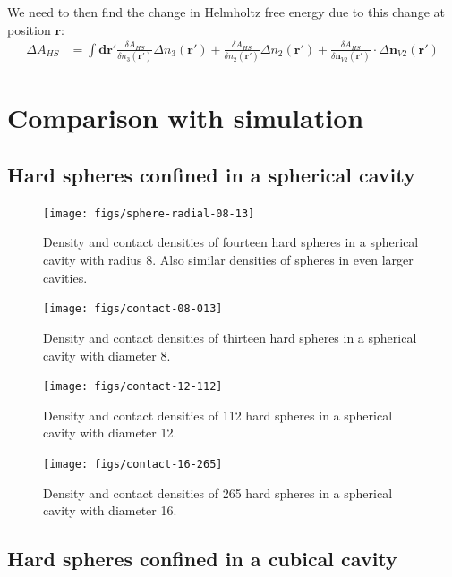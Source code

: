 \documentclass[letterpaper,twocolumn,amsmath,amssymb,prb]{revtex4-1}
\begin{document}
\begin{widetext}
We need to then find the change in Helmholtz free energy due to this
change at position $\mathbf{r}$:
\begin{align}
  \Delta A_{HS} &= \int \mathbf{dr}'
  \frac{\delta A_{HS}}{\delta n_3(\mathbf{r}')}\Delta n_3(\mathbf{r}')
  +
  \frac{\delta A_{HS}}{\delta n_2(\mathbf{r}')}\Delta n_2(\mathbf{r}')
  +
  \frac{\delta A_{HS}}{\delta \mathbf{n}_{V2}(\mathbf{r}')} \cdot \Delta \mathbf{n}_{V2}(\mathbf{r}')
\end{align}

\end{widetext}

\section{Comparison with simulation}

\subsection{Hard spheres confined in a spherical cavity}

\begin{figure}
  \texttt{[image: figs/sphere-radial-08-13]}
  \caption{Density and contact densities of fourteen hard spheres in a
    spherical cavity with radius 8.  Also similar densities of spheres
    in even larger cavities.}
  \label{fig:sphere-density2}
\end{figure}

\begin{figure}
  \texttt{[image: figs/contact-08-013]}
  \caption{Density and contact densities of thirteen hard spheres in a
    spherical cavity with diameter 8.}
  \label{fig:sphere-8}
\end{figure}

\begin{figure}
  \texttt{[image: figs/contact-12-112]}
  \caption{Density and contact densities of 112 hard spheres in a
    spherical cavity with diameter 12.}
  \label{fig:sphere-12}
\end{figure}

\begin{figure}
  \texttt{[image: figs/contact-16-265]}
  \caption{Density and contact densities of 265 hard spheres in a
    spherical cavity with diameter 16.}
  \label{fig:sphere-16}
\end{figure}

\subsection{Hard spheres confined in a cubical cavity}
\end{document}
